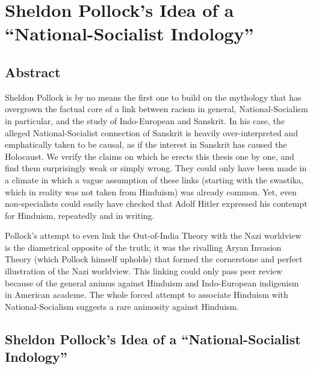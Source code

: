 \chapter[Pollock’s Idea of a “National-Socialist Indology”]{Sheldon Pollock’s Idea of a “National-Socialist Indology”}\label{chapter3}


\section*{Abstract}

Sheldon Pollock is by no means the first one to build on the mythology that has overgrown the factual core of a link between racism in general, National-Socialism in particular, and the study of Indo-European and Sanskrit. In his case, the alleged National-Socialist connection of Sanskrit is heavily over-interpreted and emphatically taken to be causal, as if the interest in Sanskrit has caused the Holocaust. We verify the claims on which he erects this thesis one by one, and find them surprisingly weak or simply wrong. They could only have been made in a climate in which a vague assumption of these links (starting with the swastika, which in reality was not taken from Hinduism) was already common. Yet, even non-specialists could easily have checked that Adolf Hitler expressed his contempt for Hinduism, repeatedly and in writing.

Pollock’s attempt to even link the Out-of-India Theory with the Nazi worldview is the diametrical opposite of the truth; it was the rivalling Aryan Invasion Theory (which Pollock himself upholds) that formed the cornerstone and perfect illustration of the Nazi worldview. This linking could only pass peer review because of the general animus against Hinduism and Indo-European indigenism in American academe. The whole forced attempt to associate Hinduism with National-Socialism suggests a rare animosity against Hinduism.  

\section*{Sheldon Pollock’s Idea of a “National-Socialist Indology”}

